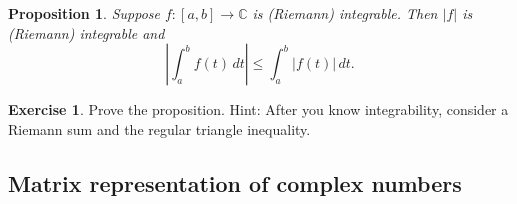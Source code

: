 \documentclass[12pt,openany]{book}
\newcommand{\sabs}[1]{\lvert {#1} \rvert}
\newcommand{\abs}[1]{\left\lvert {#1} \right\rvert}
\newcommand{\C}{{\mathbb{C}}}
\theoremstyle{plain}
\newtheorem{prop}[thm]{Proposition}
\theoremstyle{remark}
\theoremstyle{definition}
\newenvironment{exbox}{%
    \def\FrameCommand{\vrule width 1pt \relax\hspace{10pt}}%
    \MakeFramed{\advance\hsize-\width\FrameRestore}%
}{%
    \endMakeFramed
}
\theoremstyle{exercise}
\newtheorem{exercise}{Exercise}[section]
\theoremstyle{example}
\begin{document}
\begin{prop} \label{prop:inttriangleineq}
Suppose $f \colon [a,b] \to \C$ is (Riemann) integrable.  Then $\sabs{f}$ is
(Riemann) integrable and
\begin{equation*}
\abs{\int_a^b f(t) \, dt} \leq 
\int_a^b \abs{f(t)} \, dt .
\end{equation*}
\end{prop}

\begin{exbox}
\begin{exercise}
Prove the proposition.  Hint: After you know integrability, consider
a Riemann sum and the regular triangle inequality.
\end{exercise}
\end{exbox}

\subsection{Matrix representation of complex numbers}
\end{document}
